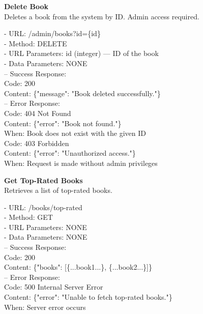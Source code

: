\begin{flushleft}
    \textbf{Delete Book} \\
    Deletes a book from the system by ID. Admin access required.

    - URL: /admin/books?id=\{id\} \\
    - Method: DELETE \\
    - URL Parameters: id (integer) — ID of the book \\
    - Data Parameters: NONE \\
    – Success Response: \\
    Code: 200 \\
    Content: \{"message": "Book deleted successfully."\} \\
    – Error Response: \\
    Code: 404 Not Found \\
    Content: \{"error": "Book not found."\} \\
    When: Book does not exist with the given ID \\
    Code: 403 Forbidden \\
    Content: \{"error": "Unauthorized access."\} \\
    When: Request is made without admin privileges
\end{flushleft}

\begin{flushleft}
    \textbf{Get Top-Rated Books} \\
    Retrieves a list of top-rated books.

    - URL: /books/top-rated \\
    - Method: GET \\
    - URL Parameters: NONE \\
    - Data Parameters: NONE \\
    – Success Response: \\
    Code: 200 \\
    Content: \{"books": [\{...book1...\}, \{...book2...\}]\} \\
    – Error Response: \\
    Code: 500 Internal Server Error \\
    Content: \{"error": "Unable to fetch top-rated books."\} \\
    When: Server error occurs
\end{flushleft}

